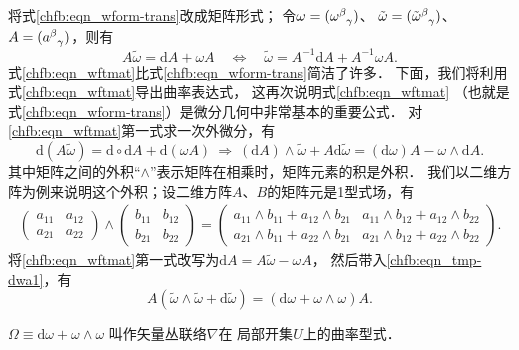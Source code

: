 将式\eqref{chfb:eqn_wform-trans}改成矩阵形式；
令$\omega=(\omega_{\hphantom{\alpha}\gamma}^\beta)$、
$\tilde{\omega}=(\tilde{\omega}_{\hphantom{\alpha}\gamma}^\beta)$、
$A=(a_{\hphantom{\alpha}\gamma}^\beta)$，则有
\begin{equation}\label{chfb:eqn_wftmat}
    A \tilde{\omega}= \mathrm{d}A + \omega A
    \quad \Leftrightarrow \quad
    \tilde{\omega}= A^{-1} \mathrm{d}A + A^{-1}\omega A .
\end{equation}
式\eqref{chfb:eqn_wftmat}比式\eqref{chfb:eqn_wform-trans}简洁了许多．
下面，我们将利用式\eqref{chfb:eqn_wftmat}导出曲率表达式，
这再次说明式\eqref{chfb:eqn_wftmat}
（也就是式\eqref{chfb:eqn_wform-trans}）是微分几何中非常基本的重要公式．
对\eqref{chfb:eqn_wftmat}第一式求一次外微分，有
\begin{equation}\label{chfb:eqn_tmp-dwa1}
    \mathrm{d} (A \tilde{\omega})= \mathrm{d}\circ\mathrm{d}A + \mathrm{d}(\omega A)
    \ \Rightarrow \
    (\mathrm{d} A)\wedge \tilde{\omega}+ A \mathrm{d} \tilde{\omega} 
    =(\mathrm{d}\omega) A - \omega\wedge \mathrm{d} A .
\end{equation}
其中矩阵之间的外积“$\wedge$”表示矩阵在相乘时，矩阵元素的积是外积．
我们以二维方阵为例来说明这个外积；设二维方阵$A$、$B$的矩阵元是1型式场，有
\begin{align*}
	\begin{pmatrix}
		a_{11} & a_{12} \\ a_{21} & a_{22} 
	\end{pmatrix} \wedge
	\begin{pmatrix}
		b_{11} & b_{12} \\ b_{21} & b_{22} 
	\end{pmatrix} 
	=\begin{pmatrix}
		a_{11}\wedge b_{11} + a_{12}\wedge b_{21} & a_{11}\wedge b_{12} + a_{12}\wedge b_{22} \\ 
		a_{21}\wedge b_{11} + a_{22}\wedge b_{21} & a_{21}\wedge b_{12} + a_{22}\wedge b_{22}
	\end{pmatrix}.
\end{align*}
将\eqref{chfb:eqn_wftmat}第一式改写为$\mathrm{d} A = A \tilde{\omega}-\omega A $，
然后带入\eqref{chfb:eqn_tmp-dwa1}，有
\begin{equation}\label{chfb:eqn_ATheta}
    A (\tilde{\omega}\wedge \tilde{\omega} + \mathrm{d} \tilde{\omega} )
    =(\mathrm{d}\omega +  \omega\wedge\omega )A .
\end{equation}


\begin{definition}
    $\Omega \equiv \mathrm{d}\omega +  \omega\wedge\omega$ 叫作矢量丛联络$\nabla$在
    局部开集$U$上的{\heiti 曲率型式}．
\end{definition}

